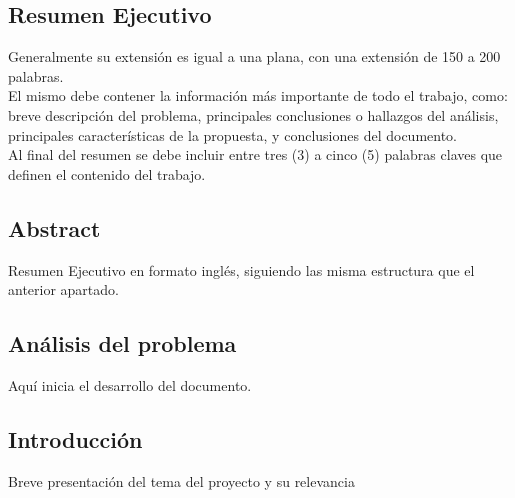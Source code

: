 \documentclass[12pt,letterpaper]{report}
\begin{document}
	\caratulaTapa
	\caratulaContenido
	\newpage
	\clearpage
	\pagestyle{empty}
	
	{
	
	
	}
	
	\newpage
	\begin{center}
	\section*{Resumen Ejecutivo}
	\end{center}
	Generalmente su extensión es igual a una plana, con una extensión de 150 a 200 palabras.\\
El mismo debe contener la información más importante de todo el trabajo, como:
breve descripción del problema, principales conclusiones o hallazgos del análisis,
principales características de la propuesta, y conclusiones del documento.\\
Al final del resumen se debe incluir entre tres (3) a cinco (5) palabras claves que
definen el contenido del trabajo.
	\thispagestyle{empty}
	\newpage
	\begin{center}
	\section*{Abstract}
	Resumen Ejecutivo en formato inglés, siguiendo las misma estructura que el anterior apartado.
	
	\end{center}
	
	\thispagestyle{empty}
	\newpage
	
	\configurarIndices
    \tableofcontents
    \thispagestyle{empty}
    \newpage
    \listoffigures
    \thispagestyle{empty}
    \newpage
    \listoftables
    \thispagestyle{empty}
    \newpage
	
	
	\iniciarNumeracion
	\renewcommand{\thesection}{\arabic{section}}
	\begin{center}
	\section{Análisis del problema}
	\end{center}
	
	Aquí inicia el desarrollo del documento.
	\subsection{Introducción}
	Breve presentación del tema del proyecto y su relevancia
\end{document}
